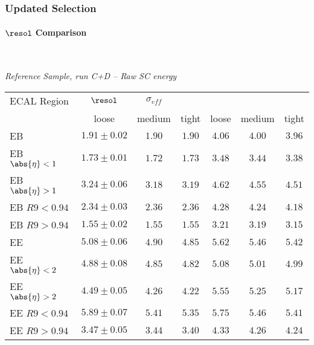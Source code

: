 \documentclass[8pt,serif]{beamer}
\begin{document}
\begin{frame}
\frametitle{Updated Selection}
 \framesubtitle{$ \resol $ Comparison}
\\
  \begin{center}
    \emph{Reference Sample, run C+D -- Raw SC energy}
\vspace{15mm}

\tiny \begin{tabular}{|l|c|c|c||c|c|c|} 
\hline  
ECAL Region &  \multicolumn{c|}{3}{$\resol$} & \multicolumn{c|}{3}{$\sigma_{eff}$} \\
            &  loose &  medium &  tight   &  loose &  medium &  tight \\ 
\hline     
EB                  & $1.91 \pm 0.02$ & $1.90$ & $1.90$ & $4.06$ & $4.00$ & $3.96$ \\
EB $\abs{\eta} < 1$ & $1.73 \pm 0.01$ & $1.72$ & $1.73$ & $3.48$ & $3.44$ & $3.38$ \\
EB $\abs{\eta} > 1$ & $3.24 \pm 0.06$ & $3.18$ & $3.19$ & $4.62$ & $4.55$ & $4.51$ \\
EB $R9 < 0.94$      & $2.34 \pm 0.03$ & $2.36$ & $2.36$ & $4.28$ & $4.24$ & $4.18$ \\
EB $R9 > 0.94$      & $1.55 \pm 0.02$ & $1.55$ & $1.55$ & $3.21$ & $3.19$ & $3.15$ \\
\hline
EE                  & $5.08 \pm 0.06$ & $4.90$ & $4.85$ & $5.62$ & $5.46$ & $5.42$ \\
EE $\abs{\eta} < 2$ & $4.88 \pm 0.08$ & $4.85$ & $4.82$ & $5.08$ & $5.01$ & $4.99$ \\
EE $\abs{\eta} > 2$ & $4.49 \pm 0.05$ & $4.26$ & $4.22$ & $5.55$ & $5.25$ & $5.17$ \\
EE $R9 < 0.94$      & $5.89 \pm 0.07$ & $5.41$ & $5.35$ & $5.75$ & $5.46$ & $5.41$ \\
EE $R9 > 0.94$      & $3.47 \pm 0.05$ & $3.44$ & $3.40$ & $4.33$ & $4.26$ & $4.24$ \\
\hline  
\end{tabular} 
  \end{center}


\end{frame}
\end{document}
